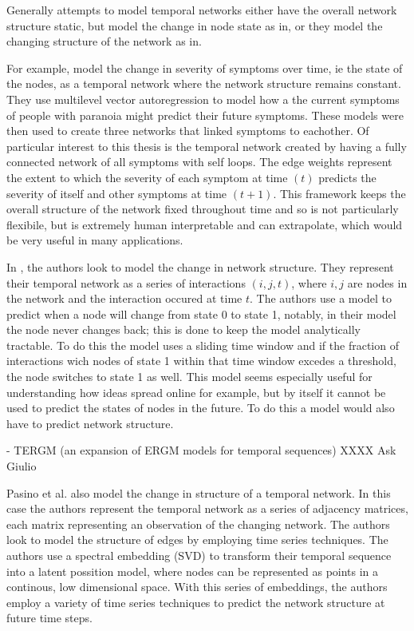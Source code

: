 \documentclass[12pt]{amsart}
\begin{document}
    
    Generally attempts to model temporal networks either have the overall network structure static, but model the change in node state as in\cite{contreras2020temporal}, or they model the changing structure of the network as in\cite{KARIMI20133476}. 

    For example, \cite{contreras2020temporal} model the change in severity of symptoms over time, ie the state of the nodes, as a temporal network where the network structure remains constant. They use multilevel vector autoregression to model how a the current symptoms of people with paranoia might predict their future symptoms. These models were then used to create three networks that linked symptoms to eachother. Of particular interest to this thesis is the temporal network created by having a fully connected network of all symptoms with self loops. The edge weights represent the extent to which the severity of each symptom at time $(t)$ predicts the severity of itself and other symptoms at time $(t+1)$. This framework keeps the overall structure of the network fixed throughout time and so is not particularly flexibile, but is extremely human interpretable and can extrapolate, which would be very useful in many applications. 

    In \cite{KARIMI20133476}, the authors look to model the change in network structure. They represent their temporal network as a series of interactions $(i,j,t)$, where $i,j$ are nodes in the network and the interaction occured at time $t$. The authors use a model to predict when a node will change from state 0 to state 1, notably, in their model the node never changes back; this is done to keep the model analytically tractable. To do this the model uses a sliding time window and if the fraction of interactions wich nodes of state 1 within that time window excedes a threshold, the node switches to state 1 as well. This model seems especially useful for understanding how ideas spread online for example, but by itself it cannot be used to predict the states of nodes in the future. To do this a model would also have to predict network structure.

    \cite{hanneke2010discrete} - TERGM (an expansion of ERGM models for temporal sequences) XXXX Ask Giulio

    Pasino et al.\cite{sanna2021link} also model the change in structure of a temporal network. In this case the authors represent the temporal network as a series of adjacency matrices, each matrix representing an observation of the changing network. The authors look to model the structure of edges by employing time  series techniques. The authors use a spectral embedding (SVD) to transform their temporal sequence into a latent possition model, where nodes can be represented as points in a continous, low dimensional space. With this series of embeddings, the authors employ a variety of time series techniques to predict the network structure at future time steps.
\end{document}
